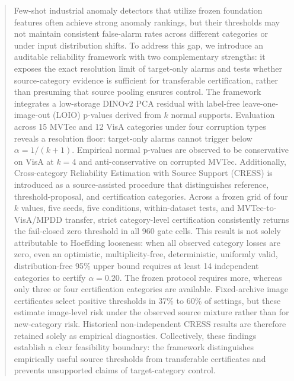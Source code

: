 \begin{abstract}
Few-shot industrial anomaly detectors that utilize frozen foundation features often achieve strong anomaly rankings, but their thresholds may not maintain consistent false-alarm rates across different categories or under input distribution shifts. To address this gap, we introduce an auditable reliability framework with two complementary strengths: it exposes the exact resolution limit of target-only alarms and tests whether source-category evidence is sufficient for transferable certification, rather than presuming that source pooling ensures control. The framework integrates a low-storage DINOv2 PCA residual with label-free leave-one-image-out (LOIO) p-values derived from $k$ normal supports. Evaluation across 15 MVTec and 12 VisA categories under four corruption types reveals a resolution floor: target-only alarms cannot trigger below $\alpha=1/(k{+}1)$. Empirical normal p-values are observed to be conservative on VisA at $k=4$ and anti-conservative on corrupted MVTec. Additionally, Cross-category Reliability Estimation with Source Support (CRESS) is introduced as a source-assisted procedure that distinguishes reference, threshold-proposal, and certification categories. Across a frozen grid of four $k$ values, five seeds, five conditions, within-dataset tests, and MVTec-to-VisA/MPDD transfer, strict category-level certification consistently returns the fail-closed zero threshold in all 960 gate cells. This result is not solely attributable to Hoeffding looseness: when all observed category losses are zero, even an optimistic, multiplicity-free, deterministic, uniformly valid, distribution-free 95\% upper bound requires at least 14 independent categories to certify $\alpha=0.20$. The frozen protocol requires more, whereas only three or four certification categories are available. Fixed-archive image certificates select positive thresholds in 37\% to 60\% of settings, but these estimate image-level risk under the observed source mixture rather than for new-category risk. Historical non-independent CRESS results are therefore retained solely as empirical diagnostics. Collectively, these findings establish a clear feasibility boundary: the framework distinguishes empirically useful source thresholds from transferable certificates and prevents unsupported claims of target-category control.
\end{abstract}
